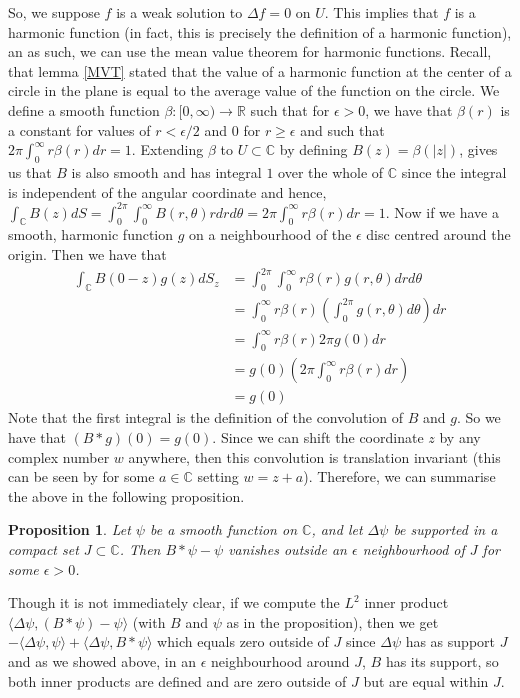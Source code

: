 \documentclass[11pt]{report}
\newtheorem{prop}[thm]{Proposition}
\theoremstyle{definition}
\begin{document}
So, we suppose $f$ is a weak solution to $\Delta f = 0$ on $U$. This implies that $f$ is a harmonic function (in fact, this is precisely the definition of a harmonic function), an as such, we can use the mean value theorem for harmonic functions. Recall, that lemma \ref{MVT} stated that the value of a harmonic function at the center of a circle in the plane is equal to the average value of the function on the circle. We define a smooth function $\beta:[0,\infty)\rightarrow \mathbb{R}$ such that for $\epsilon > 0$, we have that $\beta(r)$ is a constant for values of $r < \epsilon / 2$ and $0$ for $r \geq \epsilon$ and such that $2\pi \int_0^{\infty}r\beta(r)dr = 1$. Extending $\beta$ to $U \subset \mathbb{C}$ by defining $B(z)=\beta(|z|)$, gives us that $B$ is also smooth and has integral $1$ over the whole of $\mathbb{C}$ since the integral is independent of the angular coordinate and hence, $\int_{\mathbb{C}}B(z)dS=\int_0^{2\pi}\int_0^{\infty}B(r,\theta)rdrd\theta = 2\pi\int_0^{\infty}r\beta(r)dr = 1$. Now if we have a smooth, harmonic function $g$ on a neighbourhood of the $\epsilon$ disc centred around the origin. Then we have that 
\begin{align*}
  \int_{\mathbb{C}}B(0-z)g(z)dS_z &= \int_0^{2\pi}\int_0^{\infty}r\beta(r)g(r,\theta)drd\theta \\
  &= \int_0^{\infty}r\beta(r)\left(\int_0^{2\pi}g(r,\theta)d\theta\right) dr \\
  &= \int_0^{\infty}r\beta(r)2\pi g(0) dr \\
  &= g(0)\left(2\pi\int_0^{\infty}r\beta(r)dr\right) \\
  &=g(0)
\end{align*}
Note that the first integral is the definition of the convolution of $B$ and $g$. So we have that $(B*g)(0) = g(0)$. Since we can shift the coordinate $z$ by any complex number $w$ anywhere, then this convolution is translation invariant (this can be seen by for some $a \in \mathbb{C}$ setting $w = z + a$). Therefore, we can summarise the above in the following proposition.

\begin{prop}
  Let $\psi$ be a smooth function on $\mathbb{C}$, and let $\Delta \psi$ be supported in a compact set $J \subset \mathbb{C}$. Then $B*\psi - \psi$ vanishes outside an $\epsilon$ neighbourhood of $J$ for some $\epsilon > 0$.
\end{prop}

Though it is not immediately clear, if we compute the $L^2$ inner product $\langle \Delta \psi, (B*\psi) - \psi \rangle$ (with $B$ and $\psi$ as in the proposition), then we get $-\langle \Delta \psi, \psi \rangle + \langle \Delta \psi, B*\psi \rangle$ which equals zero outside of $J$ since $\Delta \psi$ has as support $J$ and as we showed above, in an $\epsilon$ neighbourhood around $J$, $B$ has its support, so both inner products are defined and are zero outside of $J$ but are equal within $J$.  
\end{document}
